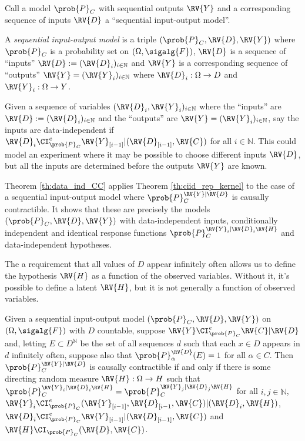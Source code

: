 Call a model $\prob{P}_C$ with sequential outputs $\RV{Y}$ and a corresponding sequence of inputs $\RV{D}$ a ``sequential input-output model''.

\begin{definition}
A \emph{sequential input-output model} is a triple $(\prob{P}_C,\RV{D},\RV{Y})$ where $\prob{P}_C$ is a probability set on $(\Omega,\sigalg{F})$, $\RV{D}$ is a sequence of ``inputs'' $\RV{D}:=(\RV{D}_i)_{i\in\mathbb{N}}$ and $\RV{Y}$ is a corresponding sequence of ``outputs'' $\RV{Y}=(\RV{Y}_i)_{i\in\mathbb{N}}$ where $\RV{D}_i:\Omega\to D$ and $\RV{Y}_i:\Omega\to Y$.
\end{definition}

Given a sequence of variables $(\RV{D}_i,\RV{Y}_i)_{i\in \mathbb{N}}$ where the ``inputs'' are $\RV{D}:=(\RV{D}_i)_{i\in\mathbb{N}}$ and the ``outputs'' are $\RV{Y}=(\RV{Y}_i)_{i\in\mathbb{N}}$, say the inputs are data-independent if $\RV{D}_i\CI^e_{\prob{P}_C} \RV{Y}_{[i-1]}|(\RV{D}_{[i-1]},\RV{C})$ for all $i\in\mathbb{N}$. This could model an experiment where it may be possible to choose different inputs $\RV{D}$, but all the inputs are determined before the outputs $\RV{Y}$ are known.

Theorem \ref{th:data_ind_CC} applies Theorem \ref{th:ciid_rep_kernel} to the case of a sequential input-output model where $\prob{P}_C^{\RV{Y}|\RV{D}}$ is causally contractible. It shows that these are precisely the models $(\prob{P}_C,\RV{D},\RV{Y})$ with data-independent inputs, conditionally independent and identical response functions $\prob{P}_C^{\RV{Y}_i|\RV{D}_i\RV{H}}$ and data-independent hypotheses.

The a requirement that all values of $D$ appear infinitely often allows us to define the hypothesis $\RV{H}$ as a function of the observed variables. Without it, it's possible to define a latent $\RV{H}$, but it is not generally a function of observed variables.

\begin{theorem}\label{th:data_ind_CC}
Given a sequential input-output model $(\prob{P}_C,\RV{D},\RV{Y})$ on $(\Omega,\sigalg{F})$ with $D$ countable, suppose $\RV{Y}\CI^e_{\prob{P}_C} \RV{C}|\RV{D}$ and, letting $E\subset D^{\mathbb{N}}$ be the set of all sequences $d$ such that each $x\in D$ appears in $d$ infinitely often, suppose also that $\prob{P}_\alpha^{\RV{D}}(E)=1$ for all $\alpha\in C$. Then $\prob{P}_C^{\RV{Y}|\RV{D}}$ is causally contractible if and only if there is some directing random measure $\RV{H}:\Omega\to H$ such that $\prob{P}_C^{\RV{Y}_i|\RV{D}_i\RV{H}}=\prob{P}_C^{\RV{Y}_j|\RV{D}_j\RV{H}}$ for all $i,j\in \mathbb{N}$, $\RV{Y}_{i}\CI^e_{\prob{P}_C} (\RV{Y}_{[i-1]},\RV{D}_{[i-1},\RV{C})|(\RV{D}_i,\RV{H})$, $\RV{D}_i\CI^e_{\prob{P}_C} \RV{Y}_{[i-1]}|(\RV{D}_{[i-1]},\RV{C})$ and $\RV{H}\CI_{\prob{P}_C} (\RV{D},\RV{C})$.
\end{theorem}

